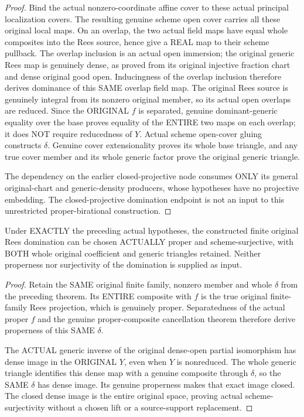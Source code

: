 \begin{proof}
Bind the actual nonzero-coordinate affine cover to these actual principal
localization covers.  The resulting genuine scheme open cover carries all
these original local maps.  On an overlap, the two actual field maps have
equal whole composites into the Rees source, hence give a REAL map to their
scheme pullback.  The overlap inclusion is an actual open immersion; the
original generic Rees map is genuinely dense, as proved from its original
injective fraction chart and dense original good open.  Inducingness of the
overlap inclusion therefore derives dominance of this SAME overlap field
map.  The original Rees source is genuinely integral from its nonzero original
member, so its actual open overlaps are reduced.  Since the ORIGINAL $f$ is
separated, genuine dominant-generic equality over the base proves equality
of the ENTIRE two maps on each overlap; it does NOT require reducedness of
$Y$.  Actual scheme open-cover gluing constructs $\delta$.  Genuine cover
extensionality proves its whole base triangle, and any true cover member
and its whole generic factor prove the original generic triangle.

The dependency on the earlier closed-projective node consumes ONLY its
general original-chart and generic-density producers, whose hypotheses have
no projective embedding.  The closed-projective domination endpoint is not
an input to this unrestricted proper-birational construction.
\end{proof}

\begin{theorem}
\label{scheme:actual-proper-surjective-original-rees-domination}
\leanok
{}
Under EXACTLY the preceding actual hypotheses, the constructed finite
original Rees domination can be chosen ACTUALLY proper and scheme-surjective,
with BOTH whole original coefficient and generic triangles retained.
Neither properness nor surjectivity of the domination is supplied as input.
\end{theorem}
\begin{proof}
Retain the SAME original finite family, nonzero member and whole $\delta$ from
the preceding theorem.  Its ENTIRE composite with $f$ is the true original
finite-family Rees projection, which is genuinely proper.  Separatedness
of the actual proper $f$ and the genuine proper-composite cancellation theorem
therefore derive properness of this SAME $\delta$.

The ACTUAL generic inverse of the original dense-open partial isomorphism has
dense image in the ORIGINAL $Y$, even when $Y$ is nonreduced.  The whole
generic triangle identifies this dense map with a genuine composite through
$\delta$, so the SAME $\delta$ has dense image.  Its genuine properness makes
that exact image closed.  The closed dense image is the entire original
space, proving actual scheme-surjectivity without a chosen lift or a
source-support replacement.
\end{proof}

